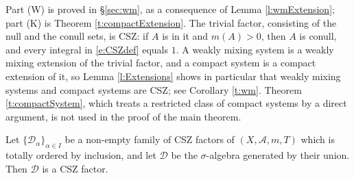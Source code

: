 Part (W) is proved in \S\ref{sec:wm}, as a consequence of Lemma \ref{l:wmExtension}; part (K) is Theorem \ref{t:compactExtension}.  
The trivial factor, consisting of the null and the conull sets, is CSZ: if $A$ is in it and $m(A)>0$, then $A$ is conull, 
and every integral in \eqref{e:CSZdef} equals $1$.  
A weakly mixing system is a weakly mixing extension of the trivial factor, and a compact system is a compact extension of it, 
so Lemma \ref{l:Extensions} shows in particular that weakly mixing systems and compact systems are CSZ; see Corollary \ref{t:wm}.  
Theorem \ref{t:compactSystem}, which treats a restricted class of compact systems by a direct argument, 
is not used in the proof of the main theorem.  

\begin{lemma}[Chains] \label{l:chain}
Let $\{\mathcal D_\alpha\}_{\alpha \in I}$ be a non-empty family of CSZ factors of $(X,\mathcal A,m,T)$ which is totally ordered by inclusion, 
and let $\mathcal D$ be the $\sigma$-algebra generated by their union.  Then $\mathcal D$ is a CSZ factor.  
\end{lemma}

